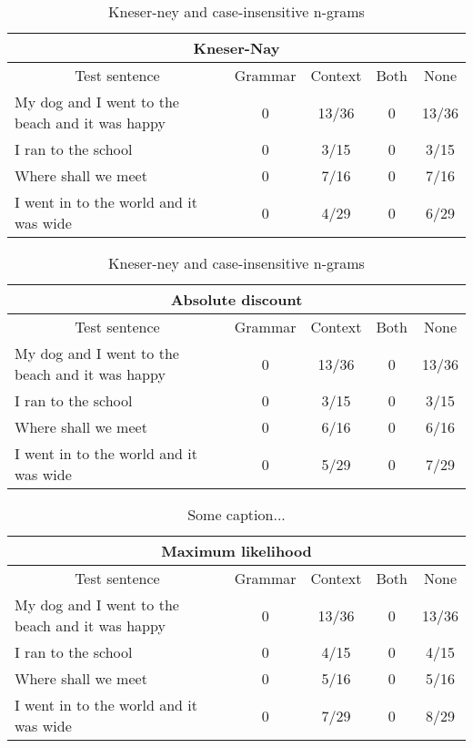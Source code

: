 {\begin{table}[H]
\centering
\caption{Kneser-ney and case-insensitive n-grams}
\begin{tabular}{ |p{}|c|c|c|c| }
	\hline
	\multicolumn{5}{|c|}{Kneser-Nay} \\
	\hline
	\multicolumn{1}{|c|}{Test sentence} & Grammar & Context & Both & None \\
	\hline
	My dog and I went to the beach and it was happy & 0 & 13/36 & 0 & 13/36 \\
	\hline
	I ran to the school & 0 & 3/15 & 0 & 3/15 \\
	\hline
	Where shall we meet & 0 & 7/16 & 0 & 7/16 \\
	\hline
	I went in to the world and it was wide & 0 & 4/29 & 0 & 6/29 \\
	\hline
\end{tabular}
\end{table}

\vspace{-1cm}
\begin{table}[H]
\centering
\caption{Kneser-ney and case-insensitive n-grams}
\begin{tabular}{ |p{}|c|c|c|c| }
	\hline
	\multicolumn{5}{|c|}{Absolute discount} \\
	\hline
	\multicolumn{1}{|c|}{Test sentence} & Grammar & Context & Both & None \\
	\hline
	My dog and I went to the beach and it was happy & 0 & 13/36 & 0 & 13/36 \\
	\hline
	I ran to the school & 0 & 3/15 & 0 & 3/15 \\
	\hline
	Where shall we meet & 0 & 6/16 & 0 & 6/16 \\
	\hline
	I went in to the world and it was wide & 0 & 5/29 & 0 & 7/29 \\
	\hline
\end{tabular}
\end{table}

\vspace{-1cm}
\begin{table}[H]
\centering
\caption{Some caption...}
\begin{tabular}{ |p{}|c|c|c|c| }
	\hline
	\multicolumn{5}{|c|}{Maximum likelihood} \\
	\hline
	\multicolumn{1}{|c|}{Test sentence} & Grammar & Context & Both & None \\
	\hline
	My dog and I went to the beach and it was happy & 0 & 13/36 & 0 &13/36 \\
	\hline
	I ran to the school & 0 & 4/15 & 0 & 4/15 \\
	\hline
	Where shall we meet & 0 & 5/16 & 0 & 5/16 \\
	\hline
	I went in to the world and it was wide & 0 & 7/29 & 0 & 8/29 \\
	\hline
\end{tabular}
\end{table}

}
